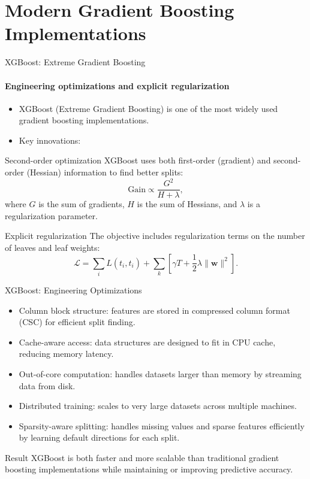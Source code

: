 \section{Modern Gradient Boosting Implementations}

\begin{frame}{XGBoost: Extreme Gradient Boosting}
  \framesubtitle{Engineering optimizations and explicit regularization}
  \begin{itemize}
    \item \alert{XGBoost} (Extreme Gradient Boosting) is one of the most widely used gradient
          boosting implementations.
    \item Key innovations:
  \end{itemize}
  \begin{block}{Second-order optimization}
    XGBoost uses both first-order (gradient) and \alert{second-order (Hessian)} information
    to find better splits:
    \[
    \text{Gain} \propto \frac{G^2}{H + \lambda},
    \]
    where $G$ is the sum of gradients, $H$ is the sum of Hessians, and $\lambda$ is a
    regularization parameter.
  \end{block}
  \begin{block}{Explicit regularization}
    The objective includes regularization terms on the number of leaves and leaf weights:
    \[
    \mathcal{L} = \sum_{i} L(t_i, \hat{t}_i) + \sum_{k} \left[\gamma T + \frac{1}{2}\lambda \|\mathbf{w}\|^2\right].
    \]
  \end{block}
\end{frame}

\begin{frame}{XGBoost: Engineering Optimizations}
  \begin{itemize}
    \item \alert{Column block structure}: features are stored in compressed column format
          (CSC) for efficient split finding.
    \item \alert{Cache-aware access}: data structures are designed to fit in CPU cache,
          reducing memory latency.
    \item \alert{Out-of-core computation}: handles datasets larger than memory by streaming
          data from disk.
    \item \alert{Distributed training}: scales to very large datasets across multiple machines.
    \item \alert{Sparsity-aware splitting}: handles missing values and sparse features efficiently
          by learning default directions for each split.
  \end{itemize}
  \begin{block}{Result}
    XGBoost is both faster and more scalable than traditional gradient boosting implementations
    while maintaining or improving predictive accuracy.
  \end{block}
\end{frame}

